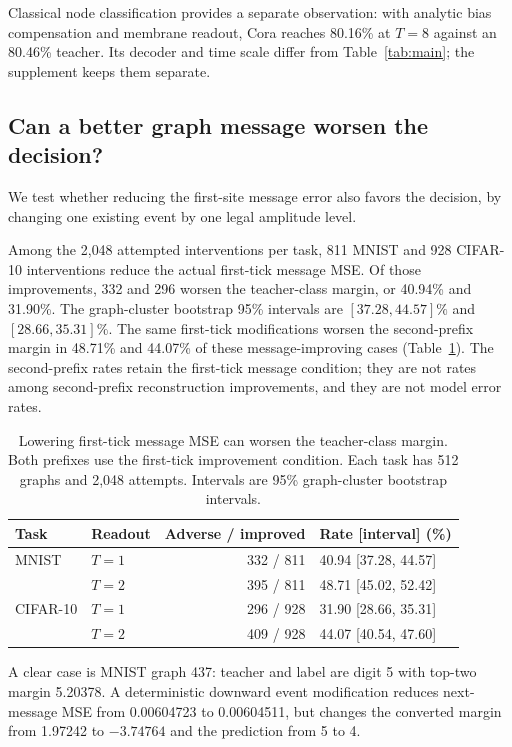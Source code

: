 \documentclass[10pt,twocolumn,letterpaper]{article}
\begin{document}
Classical node classification provides a separate observation: with analytic bias compensation and membrane readout, Cora reaches 80.16\% at $T{=}8$ against an 80.46\% teacher. Its decoder and time scale differ from Table~\ref{tab:main}; the supplement keeps them separate.

\subsection{Can a better graph message worsen the decision?}
\label{sec:decision-results}
We test whether reducing the first-site message error also favors the decision, by changing one existing event by one legal amplitude level.

Among the 2{,}048 attempted interventions per task, 811 MNIST and 928 CIFAR-10 interventions reduce the actual first-tick message MSE. Of those improvements, 332 and 296 worsen the teacher-class margin, or 40.94\% and 31.90\%. The graph-cluster bootstrap 95\% intervals are $[37.28,44.57]\%$ and $[28.66,35.31]\%$. The same first-tick modifications worsen the second-prefix margin in 48.71\% and 44.07\% of these message-improving cases (Table~\ref{tab:hard}). The second-prefix rates retain the first-tick message condition; they are not rates among second-prefix reconstruction improvements, and they are not model error rates.

\begin{table}[t]
\caption{Lowering first-tick message MSE can worsen the teacher-class margin. Both prefixes use the first-tick improvement condition. Each task has 512 graphs and 2{,}048 attempts. Intervals are 95\% graph-cluster bootstrap intervals.}
\label{tab:hard}
\centering\small
\setlength{\tabcolsep}{2.2pt}
\begin{tabular}{llrl}\toprule
Task & Readout & Adverse / improved & Rate [interval] (\%)\\\midrule
MNIST & $T{=}1$ & 332 / 811 & 40.94 [37.28, 44.57]\\
 & $T{=}2$ & 395 / 811 & 48.71 [45.02, 52.42]\\
CIFAR-10 & $T{=}1$ & 296 / 928 & 31.90 [28.66, 35.31]\\
 & $T{=}2$ & 409 / 928 & 44.07 [40.54, 47.60]\\\bottomrule
\end{tabular}
\end{table}

A clear case is MNIST graph 437: teacher and label are digit 5 with top-two margin 5.20378. A deterministic downward event modification reduces next-message MSE from 0.00604723 to 0.00604511, but changes the converted margin from 1.97242 to $-3.74764$ and the prediction from 5 to 4.
\end{document}
